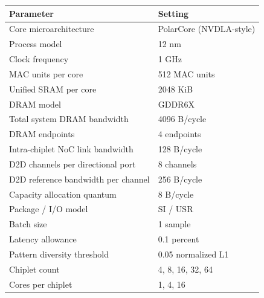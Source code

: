 \begin{tabular}{ll}
\hline
Parameter & Setting \\
\hline
Core microarchitecture & PolarCore (NVDLA-style)  \\
Process model & 12 nm \\
Clock frequency & 1 GHz \\
MAC units per core & 512 MAC units \\
Unified SRAM per core & 2048 KiB \\
DRAM model & GDDR6X  \\
Total system DRAM bandwidth & 4096 B/cycle \\
DRAM endpoints & 4 endpoints \\
Intra-chiplet NoC link bandwidth & 128 B/cycle \\
D2D channels per directional port & 8 channels \\
D2D reference bandwidth per channel & 256 B/cycle \\
Capacity allocation quantum & 8 B/cycle \\
Package / I/O model & SI / USR  \\
Batch size & 1 sample \\
Latency allowance & 0.1 percent \\
Pattern diversity threshold & 0.05 normalized L1 \\
Chiplet count & 4, 8, 16, 32, 64 \\
Cores per chiplet & 1, 4, 16 \\
\hline
\end{tabular}
